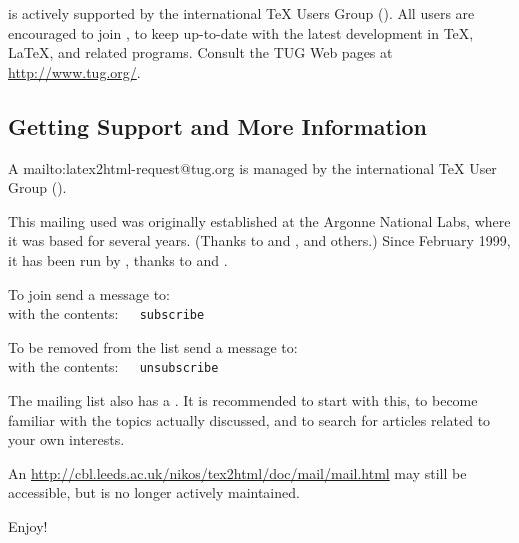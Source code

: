 \begin{itemize}
\begin{changebar}
%
\item 
\latextohtml{} is actively supported by the international 
\TeX{} Users Group (\TUGurl). All users are encouraged to join \TUGurl,
to keep up-to-date with the latest development in \TeX{}, \LaTeX,
\latextohtml{} and related programs.
Consult the TUG Web pages at \url{http://www.tug.org/}.
\end{changebar}

\end{itemize}


\subsection[center]{Getting Support and More Information\label{support}}%
%

\begin{changebar}
A %
{mailto:latex2html-request@tug.org}
is managed by the international \TeX{} User Group (\TUGurl).
 
This mailing used was originally established at the Argonne National Labs,
where it was based for several years.
(Thanks to \IanFoster{} and \BobOlson, and others.)
Since February 1999, it has been run by \TUGurl, thanks to
\ArtOgawa{} and \RossMoore.
\end{changebar}

\smallskip\noindent
To join send a message to: 
\\
with the contents:~~\texttt{ subscribe }


\smallskip\noindent
To be removed from the list send a message to: 
\\
with the contents:~~\texttt{ unsubscribe }


\bigskip\noindent
The mailing list also has a 
.
It is recommended to start with this, 
to become familiar with the topics actually discussed,
and to search for articles related to your own interests.

\begin{changebar}
An 
{\url{http://cbl.leeds.ac.uk/nikos/tex2html/doc/mail/mail.html}}
may still be accessible, but is no longer actively maintained.
\end{changebar}

\bigskip
Enjoy!

